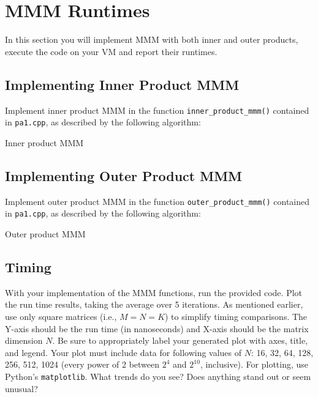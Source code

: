 \documentclass[a4 paper]{article}
\begin{document}
\section{MMM Runtimes}
\label{sec:eval}
In this section you will implement MMM with both inner and outer products, execute the code on your VM and report their runtimes.

\subsection*{Implementing Inner Product MMM}
Implement inner product MMM in the function \texttt{inner\_product\_mmm()} contained in \texttt{pa1.cpp}, as described by the following algorithm:
\begin{algorithm}
\SetAlgoLined
\SetInd{0.25em}{0.5em}
\caption{Inner product MMM}
\label{algo:naivemm-mnk}
\end{algorithm}

\subsection*{Implementing Outer Product MMM}
Implement outer product MMM in the function \texttt{outer\_product\_mmm()} contained in \texttt{pa1.cpp}, as described by the following algorithm:

\begin{algorithm}[H]
\SetAlgoLined
\SetInd{0.25em}{0.5em}
\caption{Outer product MMM}
\label{algo:naivemm-kmn}
\end{algorithm}

\subsection*{Timing}
With your implementation of the MMM functions, run the provided code.
Plot the run time results, taking the average over 5 iterations.
As mentioned earlier, use only square matrices (i.e., $M = N = K$) to simplify timing comparisons.
The Y-axis should be the run time (in nanoseconds) and X-axis should be the matrix dimension $N$.
Be sure to appropriately label your generated plot with axes, title, and legend.
Your plot must include data for following values of $N$: 16, 32, 64, 128, 256, 512, 1024 (every power of 2 between $2^4$ and $2^{10}$, inclusive).
For plotting, use Python’s \texttt{matplotlib}.
What trends do you see?
Does anything stand out or seem unusual?
\end{document}
